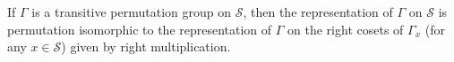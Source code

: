If $\Gamma$ is a transitive permutation group on $\mathcal{S}$, then the representation of $\Gamma$ on $\mathcal{S}$ is permutation isomorphic to the representation of $\Gamma$ on the right cosets of $\Gamma_x$ (for any $x \in \mathcal{S}$) given by right multiplication.
